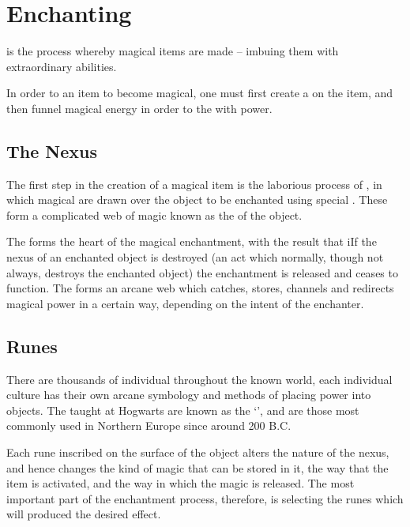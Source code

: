 

\chapter{Enchanting}
\label{S:Enchanting}

 is the process whereby magical items are made – imbuing them with extraordinary abilities. 

In order to  an item to become magical, one must first create a  on the item, and then funnel magical energy in order to  the  with power.  

\section{The Nexus}

The first step in the creation of a magical item is the laborious process of , in which magical  are drawn over the object to be enchanted using special . These  form a complicated web of magic known as the  of the object. 


The  forms the heart of the magical enchantment, with the result that iIf the nexus of an enchanted object is destroyed (an act which normally, though not always, destroys the enchanted object) the enchantment is released and ceases to function. The  forms an arcane web which catches, stores, channels and redirects magical power in a certain way, depending on the intent of the enchanter. 


\section{Runes}

There are thousands of individual  throughout the known world, each individual culture has their own arcane symbology and methods of placing power into objects. The  taught at Hogwarts are known as the `', and are those most commonly used in Northern Europe since around 200 B.C.

Each rune inscribed on the surface of the object alters the nature of the nexus, and hence changes the kind of magic that can be stored in it, the way that the item is activated, and the way in which the magic is released. The most important part of the enchantment process, therefore, is selecting the runes which will produced the desired effect.

